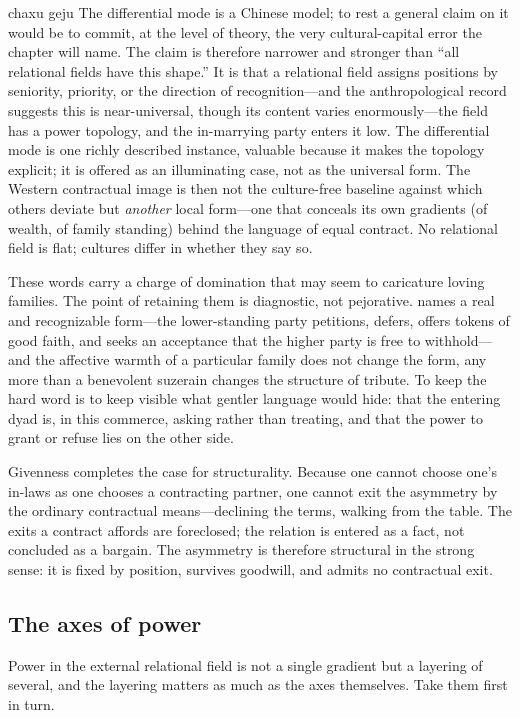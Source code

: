 chaxu geju The differential mode is a Chinese model; to rest a general claim on it would be to commit, at the level of theory, the very cultural-capital error the chapter will name. The claim is therefore narrower and stronger than ``all relational fields have this shape.'' It is that  a relational field assigns positions by seniority, priority, or the direction of recognition---and the anthropological record suggests this is near-universal, though its content varies enormously---the field has a power topology, and the in-marrying party enters it low. The differential mode is one richly described instance, valuable because it makes the topology explicit; it is offered as an illuminating case, not as the universal form. The Western contractual image is then not the culture-free baseline against which others deviate but \emph{another} local form---one that conceals its own gradients (of wealth, of family standing) behind the language of equal contract. No relational field is flat; cultures differ in whether they say so.

 These words carry a charge of domination that may seem to caricature loving families. The point of retaining them is diagnostic, not pejorative.  names a real and recognizable form---the lower-standing party petitions, defers, offers tokens of good faith, and seeks an acceptance that the higher party is free to withhold---and the affective warmth of a particular family does not change the form, any more than a benevolent suzerain changes the structure of tribute. To keep the hard word is to keep visible what gentler language would hide: that the entering dyad is, in this commerce, asking rather than treating, and that the power to grant or refuse lies on the other side.

Givenness completes the case for structurality. Because one cannot choose one's in-laws as one chooses a contracting partner, one cannot exit the asymmetry by the ordinary contractual means---declining the terms, walking from the table. The exits a contract affords are foreclosed; the relation is entered as a fact, not concluded as a bargain. The asymmetry is therefore structural in the strong sense: it is fixed by position, survives goodwill, and admits no contractual exit.

\subsection{The axes of power}
Power in the external relational field is not a single gradient but a layering of several, and the layering matters as much as the axes themselves. Take them first in turn.

